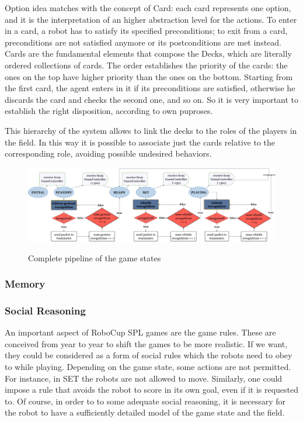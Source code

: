 \documentclass[a4paper, onecolumn, 12pt]{article}
\begin{document}
Option idea matches with the concept of Card: each card represents one option, and it is the interpretation
of an higher abstraction level for the actions. 
To enter in a card, a robot has to satisfy its specified preconditions; to exit from a card, preconditions are not
satisfied anymore or its postconditions are met instead.
Cards are the fundamental elements that compose the Decks, which are literally ordered collections of cards.
The order establishes the priority of the cards: the ones on the top have higher priority than the ones on the bottom.
Starting from the first card, the agent enters in it if its preconditions are satisfied, otherwise he discards 
the card and checks the second one, and so on. So it is very important to establish the right disposition,
according to own puproses. 

This hierarchy of the system allows to link the decks to the roles of the players in the field. 
In this way it is possible to associate just the cards relative to the corresponding role, avoiding
possible undesired behaviors. 


\begin{figure}
    \centering
    \includegraphics[width=0.9\linewidth]{assets/flowchart.png}
    \label{fig:flowchart}
    \caption{Complete pipeline of the game states}
\end{figure}

\subsubsection{Memory}


\subsubsection{Social Reasoning}

An important aspect of RoboCup SPL games are the game rules. These are conceived
from year to year to shift the games to be more realistic. If we want, they
could be considered as a form of social rules which the robots need to obey to
while playing. Depending on the game state, some actions are not permitted. For
instance, in SET the robots are not allowed to move. Similarly, one could impose
a rule that avoids the robot to score in its own goal, even if it is requested
to. Of course, in order to to some adequate social reasoning, it is necessary
for the robot to have a sufficiently detailed model of the game state and the
field.
\end{document}
